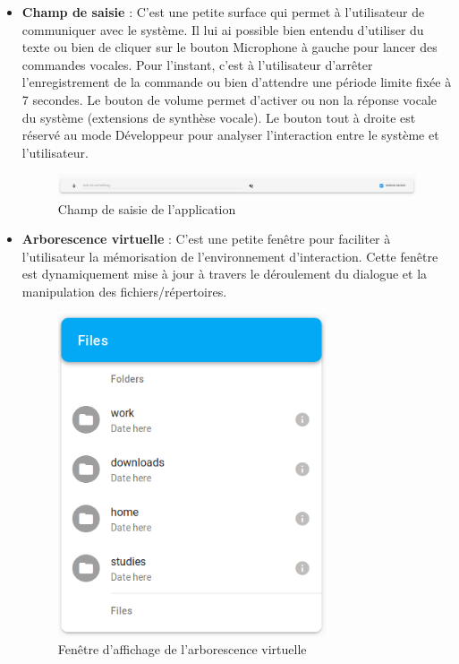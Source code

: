 \begin{itemize}
	\item \textbf{Champ de saisie} : C'est une petite surface qui permet à l'utilisateur de communiquer avec le système. Il lui ai possible bien entendu d'utiliser du texte ou bien de cliquer sur le bouton Microphone à gauche pour lancer des commandes vocales. Pour l'instant, c'est à l'utilisateur d'arrêter l'enregistrement de la commande ou bien d'attendre une période limite fixée à 7 secondes. Le bouton de volume permet d'activer ou non la réponse vocale du système (extensions de synthèse vocale). Le bouton tout à droite est réservé au mode Développeur pour analyser l'interaction entre le système et l'utilisateur.
	\begin{figure}[H]
		\centering
		\includegraphics[width=.9\linewidth]{images/Realisation/app_bar.png} 
		\caption{Champ de saisie de l'application}
	\end{figure} 
	
	\item \textbf{Arborescence virtuelle} : C'est une petite fenêtre pour faciliter à l'utilisateur la mémorisation de l'environnement d'interaction. Cette fenêtre est dynamiquement mise à jour à travers le déroulement du dialogue et la manipulation des fichiers/répertoires.
	
	\begin{figure}[H]
		\centering
		\includegraphics[width=.4\linewidth]{images/Realisation/app_browser.png}
		\caption{Fenêtre d'affichage de l'arborescence virtuelle}
	\end{figure} 
	

\end{itemize}
